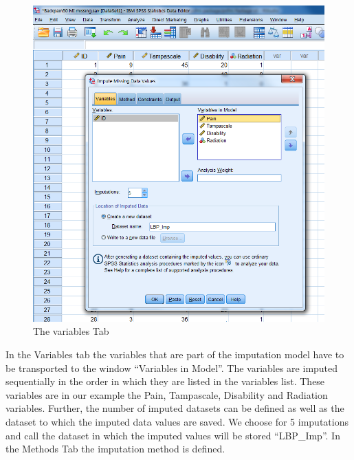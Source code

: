 \documentclass[]{book}
\begin{document}
\begin{figure}

{\centering \includegraphics[width=0.9\linewidth]{images/fig4.6} 

}

\caption{The variables Tab}\label{fig:fig4-6}
\end{figure}

In the Variables tab the variables that are part of the imputation model
have to be transported to the window ``Variables in Model''. The
variables are imputed sequentially in the order in which they are listed
in the variables list. These variables are in our example the Pain,
Tampascale, Disability and Radiation variables. Further, the number of
imputed datasets can be defined as well as the dataset to which the
imputed data values are saved. We choose for 5 imputations and call the
dataset in which the imputed values will be stored ``LBP\_Imp''. In the
Methods Tab the imputation method is defined.
\end{document}
